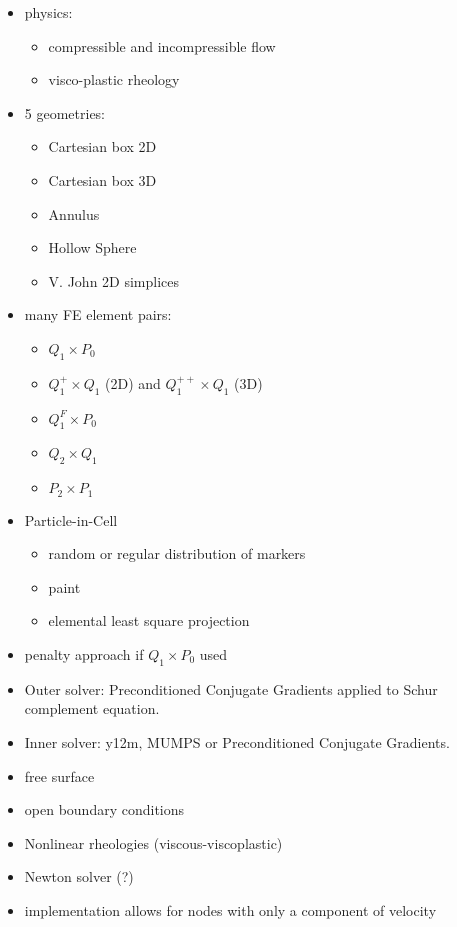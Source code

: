 \documentclass[a4paper,12pt]{article}
\begin{document}
\begin{itemize}
\item physics:
\begin{itemize}
\item compressible and incompressible flow
\item visco-plastic rheology
\end{itemize}
\item 5 geometries:
\begin{itemize}
\item Cartesian box 2D
\item Cartesian box 3D
\item Annulus
\item Hollow Sphere
\item V. John 2D simplices
\end{itemize}
\item many FE element pairs:
\begin{itemize}
\item $Q_1\times P_0$
\item $Q_1^+\times Q_1$ (2D) and $Q_1^{++}\times Q_1$ (3D)
\item $Q_1^F \times P_0$ 
\item $Q_2\times Q_1$
\item $P_2 \times P_1$
\end{itemize}
\item Particle-in-Cell
\begin{itemize}
\item random or regular distribution of markers
\item paint  
\item elemental least square projection
\end{itemize}
\item penalty approach if $Q_1\times P_0$ used
\item Outer solver: Preconditioned Conjugate Gradients applied to Schur complement equation.
\item Inner solver: y12m, MUMPS or Preconditioned Conjugate Gradients.
\item free surface
\item open boundary conditions
\item Nonlinear rheologies (viscous-viscoplastic)
\item Newton solver (?)
\item implementation allows for nodes with only a component of velocity
\end{itemize}
\end{document}

